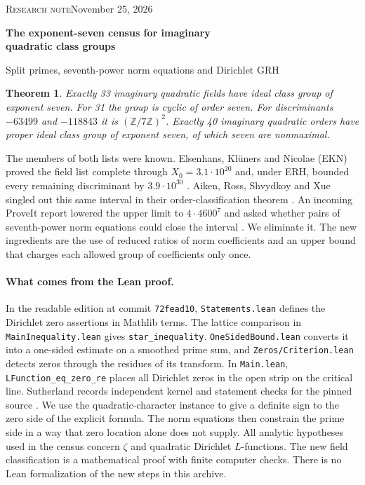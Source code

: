 \documentclass[11pt]{article}
\newtheorem{theorem}{Theorem}
\newcommand{\Z}{\mathbb Z}
\newcommand{\base}{X_0}
\begin{document}
{\small\color{accent}\textsc{Research note}\hfill November 25, 2026}\par
{\LARGE\bfseries The exponent-seven census for imaginary\\[2pt] quadratic class groups}\par
{\large Split primes, seventh-power norm equations and Dirichlet GRH}\par\medskip
\begin{theorem}\label{thm}
Exactly 33 imaginary quadratic fields have ideal class group of exponent seven.
For 31 the group is cyclic of order seven. For discriminants $-63499$ and
$-118843$ it is $(\Z/7\Z)^2$. Exactly 40 imaginary quadratic orders have proper
ideal class group of exponent seven, of which seven are nonmaximal.
\end{theorem}
The members of both lists were known. Elsenhans, Klüners and Nicolae (EKN)
proved the field list complete through $\base=3.1\cdot10^{20}$ and, under ERH,
bounded every remaining discriminant by $3.9\cdot10^{30}$ \cite{EKN}.
Aiken, Ross, Shvydkoy and Xue singled out this same interval in their
order-classification theorem \cite{ARSX}. An incoming ProveIt report lowered
the upper limit to $4\cdot4600^7$ and asked whether pairs of seventh-power norm
equations could close the interval \cite{prior}. We eliminate it.
The new ingredients are the use of reduced ratios of norm coefficients and
an upper bound that charges each allowed group of coefficients only once.

\paragraph{What comes from the Lean proof.}
In the readable edition at commit \texttt{72fead10}, \texttt{Statements.lean}
defines the Dirichlet zero assertions in Mathlib terms. The lattice comparison
in \texttt{MainInequality.lean} gives \texttt{star\_inequality}.
\texttt{OneSidedBound.lean} converts it into a one-sided estimate on a smoothed
prime sum, and \texttt{Zeros/Criterion.lean} detects zeros through the residues of
its transform. In \texttt{Main.lean}, \texttt{LFunction\_eq\_zero\_re}
places all Dirichlet zeros in the open strip on the critical line.
Sutherland records independent kernel and statement checks for the pinned
source \cite{lean,verify}. We use the quadratic-character instance to give
a definite sign to the zero side of the explicit formula. The norm equations
then constrain the prime side in a way that zero location alone does not supply.
All analytic hypotheses used in the census concern $\zeta$ and quadratic
Dirichlet $L$-functions. The new field classification is a mathematical proof
with finite computer checks. There is no Lean formalization of the new steps
in this archive.
\end{document}
